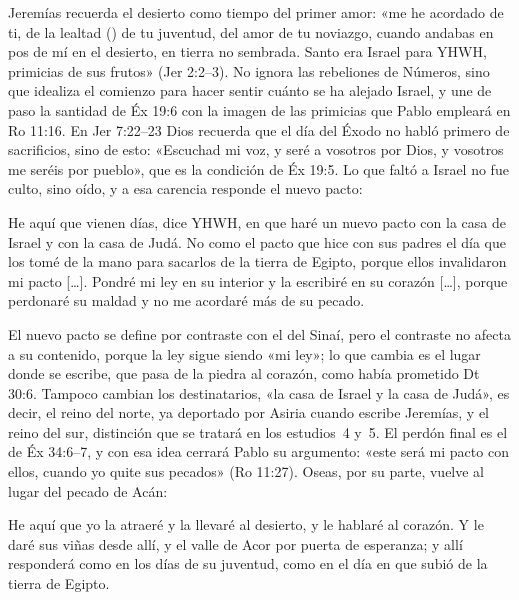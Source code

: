 Jeremías recuerda el desierto como tiempo del primer amor: «me he acordado de ti, de la lealtad () de tu juventud, del amor de tu noviazgo, cuando andabas en pos de mí en el desierto, en tierra no sembrada. Santo era Israel para YHWH, primicias de sus frutos» (Jer 2:2–3). No ignora las rebeliones de Números, sino que idealiza el comienzo para hacer sentir cuánto se ha alejado Israel, y une de paso la santidad de Éx 19:6 con la imagen de las primicias que Pablo empleará en Ro 11:16. En Jer 7:22–23 Dios recuerda que el día del Éxodo no habló primero de sacrificios, sino de esto: «Escuchad mi voz, y seré a vosotros por Dios, y vosotros me seréis por pueblo», que es la condición de Éx 19:5. Lo que faltó a Israel no fue culto, sino oído, y a esa carencia responde el nuevo pacto:

\begin{cita}He aquí que vienen días, dice YHWH, en que haré un nuevo pacto con la casa de Israel y con la casa de Judá. No como el pacto que hice con sus padres el día que los tomé de la mano para sacarlos de la tierra de Egipto, porque ellos invalidaron mi pacto [\ldots]. Pondré mi ley en su interior y la escribiré en su corazón [\ldots], porque perdonaré su maldad y no me acordaré más de su pecado.\end{cita}

El nuevo pacto se define por contraste con el del Sinaí, pero el contraste no afecta a su contenido, porque la ley sigue siendo «mi ley»; lo que cambia es el lugar donde se escribe, que pasa de la piedra al corazón, como había prometido Dt 30:6. Tampoco cambian los destinatarios, «la casa de Israel y la casa de Judá», es decir, el reino del norte, ya deportado por Asiria cuando escribe Jeremías, y el reino del sur, distinción que se tratará en los estudios~4 y~5. El perdón final es el de Éx 34:6–7, y con esa idea cerrará Pablo su argumento: «este será mi pacto con ellos, cuando yo quite sus pecados» (Ro 11:27). Oseas, por su parte, vuelve al lugar del pecado de Acán:

\begin{cita}He aquí que yo la atraeré y la llevaré al desierto, y le hablaré al corazón. Y le daré sus viñas desde allí, y el valle de Acor por puerta de esperanza; y allí responderá como en los días de su juventud, como en el día en que subió de la tierra de Egipto.\end{cita}

